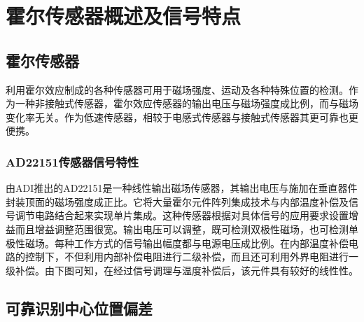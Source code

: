 \section{霍尔传感器概述及信号特点}

\subsection{霍尔传感器}
\par{利用霍尔效应制成的各种传感器可用于磁场强度、运动及各种特殊位置的检测。作为一种非接触式传感器，霍尔效应传感器的输出电压与磁场强度成比例，而与磁场变化率无关。作为低速传感器，相较于电感式传感器与接触式传感器其更可靠也更便携。}

\subsubsection{AD22151传感器信号特性}
\par{由ADI推出的AD22151是一种线性输出磁场传感器，其输出电压与施加在垂直器件封装顶面的磁场强度成正比。它将大量霍尔元件阵列集成技术与内部温度补偿及信号调节电路结合起来实现单片集成。这种传感器根据对具体信号的应用要求设置增益而且增益调整范围很宽。输出电压可以调整，既可检测双极性磁场，也可检测单极性磁场。每种工作方式的信号输出幅度都与电源电压成比例。在内部温度补偿电路的控制下，不但利用内部补偿电阻进行二级补偿，而且还可利用外界电阻进行一级补偿。由下图可知，在经过信号调理与温度补偿后，该元件具有较好的线性性。}

\subsection{可靠识别中心位置偏差}


